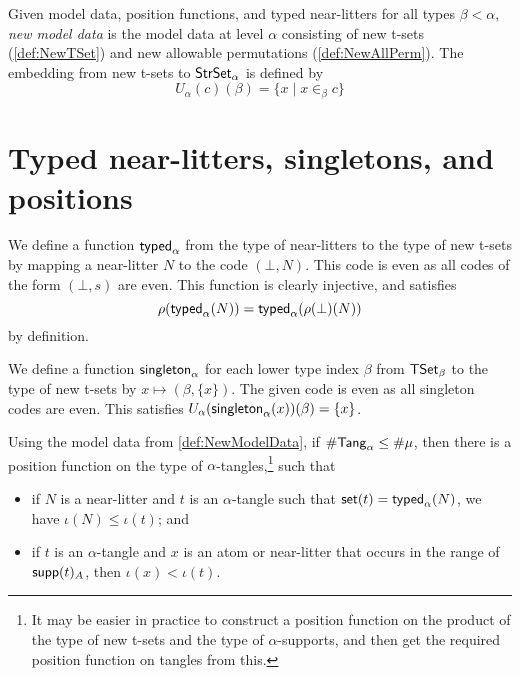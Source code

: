 \begin{definition}
  \label{def:NewModelData}
  Given model data, position functions, and typed near-litters for all types \( \beta < \alpha \), \emph{new model data} is the model data at level \( \alpha \) consisting of new t-sets (\cref{def:NewTSet}) and new allowable permutations (\cref{def:NewAllPerm}).
  The embedding from new t-sets to \( \mathsf{StrSet}_\alpha \) is defined by
  \[ U_\alpha(c)(\beta) = \{ x \mid x \in_\beta c \} \]
\end{definition}

\section{Typed near-litters, singletons, and positions}
\begin{definition}
  \label{def:newTypedNearLitter}
  We define a function \( \operatorname{\mathsf{typed}}_\alpha \) from the type of near-litters to the type of new t-sets by mapping a near-litter \( N \) to the code \( (\bot, N) \).
  This code is even as all codes of the form \( (\bot, s) \) are even.
  This function is clearly injective, and satisfies
  \[ \rho(\operatorname{\mathsf{typed}}_\alpha(N)) = \operatorname{\mathsf{typed}}_\alpha(\rho(\bot)(N)) \]
  by definition.
\end{definition}
\begin{definition}[singletons]
  \label{def:newSingleton}
  We define a function \( \operatorname{\mathsf{singleton}}_\alpha \) for each lower type index \( \beta \) from \( \mathsf{TSet}_\beta \) to the type of new t-sets by \( x \mapsto (\beta, \{x\}) \).
  The given code is even as all singleton codes are even.
  This satisfies \( U_\alpha(\operatorname{\mathsf{singleton}}_\alpha(x))(\beta) = \{ x \} \).
\end{definition}
\begin{proposition}
  \label{prop:newPos}
  Using the model data from \cref{def:NewModelData}, if \( \#\mathsf{Tang}_\alpha \leq \#\mu \), then there is a position function on the type of \( \alpha \)-tangles,\footnote{It may be easier in practice to construct a position function on the product of the type of new t-sets and the type of \( \alpha \)-supports, and then get the required position function on tangles from this.} such that
  \begin{itemize}
    \item if \( N \) is a near-litter and \( t \) is an \( \alpha \)-tangle such that \( \operatorname{\mathsf{set}}(t) = \operatorname{\mathsf{typed}}_\alpha(N) \), we have \( \iota(N) \leq \iota(t) \); and
    \item if \( t \) is an \( \alpha \)-tangle and \( x \) is an atom or near-litter that occurs in the range of \( \operatorname{\mathsf{supp}}(t)_A \), then \( \iota(x) < \iota(t) \).
  \end{itemize}
\end{proposition}
